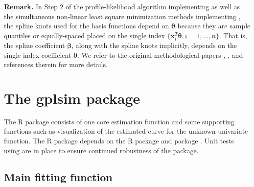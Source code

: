 {\bf Remark.} In Step 2 of the profile-likelihood algorithm implementing \cite{yu_penalised_2017} as well as the simultaneous non-linear least square minimization methods implementing \cite{yu_penalized_2002}, the spline knots used for the basis functions depend on  $\boldsymbol{\theta}$ because they are sample quantiles or equally-spaced placed on the single index $\{\boldsymbol{x}^{T}_{i} \boldsymbol{\theta}, i=1,...,n\}.$ That is, the spline coefficient ${\boldsymbol{\beta}}$, along with the spline knots implicitly, depends on the single index coefficient ${\boldsymbol{\theta}}$. We refer to the original methodological papers \cite{yu_penalized_2002}, \cite{yu_penalised_2017}, and references therein for more details.


\section{The gplsim package}
The R package  consists of one core estimation function  and some supporting functions such as visualization of the estimated curve for the unknown univariate function. The R package  depends on the R package  \citep{wood_mgcv_2001} and package  \citep{minpack2022}. Unit tests using  are in place to ensure continued robustness of the package.

\subsection{Main fitting function}

